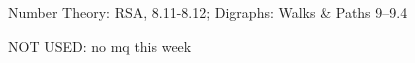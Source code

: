 \documentclass[quiz]{mcs}
\begin{document}

\begin{staffnotes}
Number Theory: RSA, 8.11-8.12; Digraphs: Walks \& Paths 9--9.4

NOT USED: no mq this week
\end{staffnotes}





\examspace[1.0in]






\end{document}
